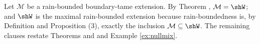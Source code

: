 Let $\mathcal{M}$ be a rain-bounded boundary-tame extension. By Theorem , $\mathcal{M} = \shW$; and $\shW$ is the maximal rain-bounded extension because rain-boundedness is, by Definition  and Proposition (3), exactly the inclusion $\mathcal{M} \subseteq \shW$. The remaining clauses restate Theorems  and  and Example \ref{ex:nullmix}.

